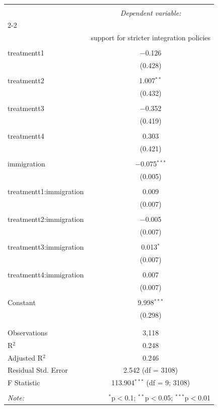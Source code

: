 \documentclass[12pt,letterpaper]{article}
\begin{document}
		\begin{table}[!htbp] \centering 
			\caption{} 
			\label{} 
			\begin{tabular}{@{\extracolsep{5pt}}lc} 
				\\[-1.8ex]\hline 
				\hline \\[-1.8ex] 
				& \multicolumn{1}{c}{\textit{Dependent variable:}} \\ 
				\cline{2-2} 
				\\[-1.8ex] &support for stricter integration policies \\ 
				\hline \\[-1.8ex] 
				treatmentt1 & $-$0.126 \\ 
				& (0.428) \\ 
				& \\ 
				treatmentt2 & 1.007$^{**}$ \\ 
				& (0.432) \\ 
				& \\ 
				treatmentt3 & $-$0.352 \\ 
				& (0.419) \\ 
				& \\ 
				treatmentt4 & 0.303 \\ 
				& (0.421) \\ 
				& \\ 
				immigration & $-$0.075$^{***}$ \\ 
				& (0.005) \\ 
				& \\ 
				treatmentt1:immigration & 0.009 \\ 
				& (0.007) \\ 
				& \\ 
				treatmentt2:immigration & $-$0.005 \\ 
				& (0.007) \\ 
				& \\ 
				treatmentt3:immigration & 0.013$^{*}$ \\ 
				& (0.007) \\ 
				& \\ 
				treatmentt4:immigration & 0.007 \\ 
				& (0.007) \\ 
				& \\ 
				Constant & 9.998$^{***}$ \\ 
				& (0.298) \\ 
				& \\ 
				\hline \\[-1.8ex] 
				Observations & 3,118 \\ 
				R$^{2}$ & 0.248 \\ 
				Adjusted R$^{2}$ & 0.246 \\ 
				Residual Std. Error & 2.542 (df = 3108) \\ 
				F Statistic & 113.904$^{***}$ (df = 9; 3108) \\ 
				\hline 
				\hline \\[-1.8ex] 
				\textit{Note:}  & \multicolumn{1}{r}{$^{*}$p$<$0.1; $^{**}$p$<$0.05; $^{***}$p$<$0.01} \\ 
			\end{tabular} 
		\end{table} 
\end{document}
